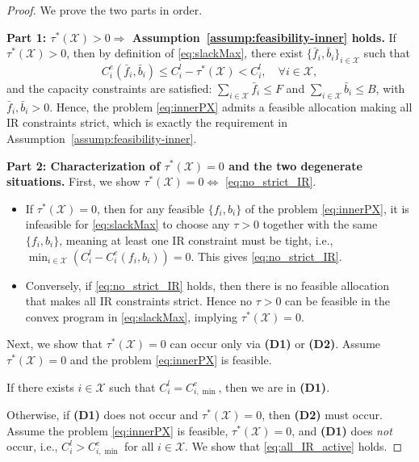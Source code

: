 \documentclass[lettersize,journal]{IEEEtran}
\begin{document}
\begin{proof}
We prove the two parts in order.

\noindent\textbf{Part 1: $\tau^*(\mathcal{X})>0 \Rightarrow$ Assumption~\ref{assump:feasibility-inner} holds.}
If $\tau^*(\mathcal{X})>0$, then by definition of \eqref{eq:slackMax}, there exist $\{\bar f_i,\bar b_i\}_{i\in \mathcal{X}}$ such that
\begin{equation}
\label{eq:strictIR_construct}
C_i^e(\bar f_i,\bar b_i)\le C_i^l-\tau^*(\mathcal{X}) < C_i^l,\quad \forall i\in \mathcal{X},
\end{equation}
and the capacity constraints are satisfied:
$\sum_{i\in \mathcal{X}}\bar f_i\le F$ and $\sum_{i\in \mathcal{X}}\bar b_i\le B$, with $\bar f_i,\bar b_i>0$.
Hence, the problem \eqref{eq:innerPX} admits a feasible allocation making all IR constraints strict, which is exactly the requirement in Assumption~\ref{assump:feasibility-inner}.

\medskip
\noindent\textbf{Part 2: Characterization of $\tau^*(\mathcal{X})=0$ and the two degenerate situations.}
First, we show $\tau^*(\mathcal{X})=0 \iff$ \eqref{eq:no_strict_IR}.
\begin{itemize}
\item If $\tau^*(\mathcal{X})=0$, then for any feasible $\{f_i,b_i\}$ of the problem \eqref{eq:innerPX}, it is infeasible for \eqref{eq:slackMax} to choose any $\tau>0$ together with the same $\{f_i,b_i\}$, meaning at least one IR constraint must be tight, i.e., $\min_{i\in \mathcal{X}}(C_i^l-C_i^e(f_i,b_i))=0$. This gives \eqref{eq:no_strict_IR}.
\item Conversely, if \eqref{eq:no_strict_IR} holds, then there is no feasible allocation that makes all IR constraints strict. Hence no $\tau>0$ can be feasible in the convex program in \eqref{eq:slackMax}, implying $\tau^*(\mathcal{X})=0$.
\end{itemize}

Next, we show that $\tau^*(\mathcal{X})=0$ can occur only via \textbf{(D1)} or \textbf{(D2)}.
Assume $\tau^*(\mathcal{X})=0$ and the problem \eqref{eq:innerPX} is feasible.

If there exists $i\in \mathcal{X}$ such that $C_i^l=C_{i,\min}^e$, then we are in \textbf{(D1)}.

Otherwise, if \textbf{(D1)} does not occur and $\tau^*(\mathcal{X})=0$, then \textbf{(D2)} must occur.
Assume the problem \eqref{eq:innerPX} is feasible, $\tau^*(\mathcal{X})=0$, and \textbf{(D1)} does \emph{not} occur, i.e., $C_i^l>C_{i,\min}^e$ for all $i\in \mathcal{X}$.
We show that \eqref{eq:all_IR_active} holds.


\end{proof}
\end{document}

